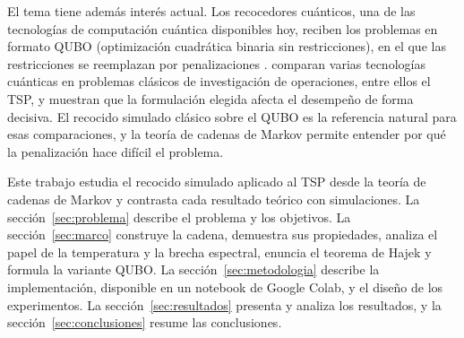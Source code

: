 El tema tiene además interés actual. Los recocedores cuánticos, una de
las tecnologías de computación cuántica disponibles hoy, reciben los
problemas en formato QUBO (optimización cuadrática binaria sin
restricciones), en el que las restricciones se reemplazan por
penalizaciones \citep{lucas2014,glover2022}. \citet{bochkarev2026}
comparan varias tecnologías cuánticas en problemas clásicos de
investigación de operaciones, entre ellos el TSP, y muestran que la
formulación elegida afecta el desempeño de forma decisiva. El recocido
simulado clásico sobre el QUBO es la referencia natural para esas
comparaciones, y la teoría de cadenas de Markov permite entender por qué
la penalización hace difícil el problema.

Este trabajo estudia el recocido simulado aplicado al TSP desde la
teoría de cadenas de Markov y contrasta cada resultado teórico con
simulaciones. La sección~\ref{sec:problema} describe el problema y los
objetivos. La sección~\ref{sec:marco} construye la cadena, demuestra
sus propiedades, analiza el papel de la temperatura y la brecha
espectral, enuncia el teorema de Hajek y formula la variante QUBO. La
sección~\ref{sec:metodologia} describe la implementación, disponible en
un notebook de Google Colab, y el diseño de los experimentos. La
sección~\ref{sec:resultados} presenta y analiza los resultados, y la
sección~\ref{sec:conclusiones} resume las conclusiones.
